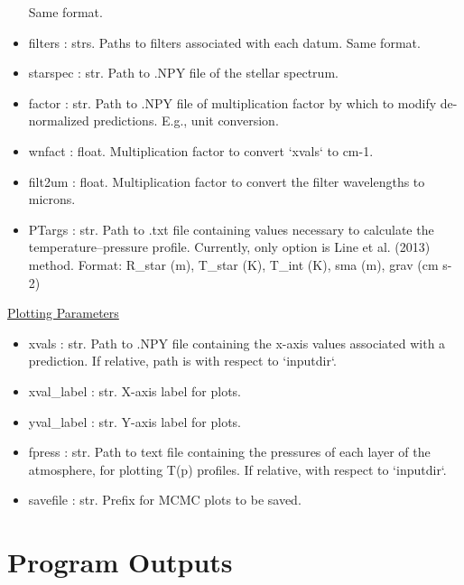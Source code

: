 \documentclass[letterpaper, 12pt]{article}
\begin{document}
\begin{itemize}
                          Same format.
\item filters     : strs. Paths to filters associated with each datum. 
                          Same format.
\item starspec    : str.  Path to .NPY file of the stellar spectrum.
\item factor      : str.  Path to .NPY file of multiplication factor by which 
                          to modify de-normalized predictions. 
                          E.g., unit conversion.
\item wnfact      : float. Multiplication factor to convert `xvals` to cm-1.
\item filt2um     : float. Multiplication factor to convert the filter 
                          wavelengths to microns.
\item PTargs      : str.  Path to .txt file containing values necessary to 
                          calculate the temperature--pressure profile.
                          Currently, only option is Line et al. (2013) method.
                          Format: R\_star (m), T\_star (K), T\_int (K), 
                                  sma    (m), grav (cm s-2)

\end{itemize}

\noindent \underline{Plotting Parameters}
\begin{itemize}
\item xvals      : str.  Path to .NPY file containing the x-axis values 
                         associated with a prediction.
                         If relative, path is with respect to `inputdir`.
\item xval\_label : str.  X-axis label for plots.
\item yval\_label : str.  Y-axis label for plots.
\item fpress     : str.  Path to text file containing the pressures of each 
                         layer of the atmosphere, for plotting T(p) profiles.
                         If relative, with respect to `inputdir`.
\item savefile   : str.  Prefix for MCMC plots to be saved.
\end{itemize}



\section{Program Outputs}
\label{sec:outputs}
\end{document}

